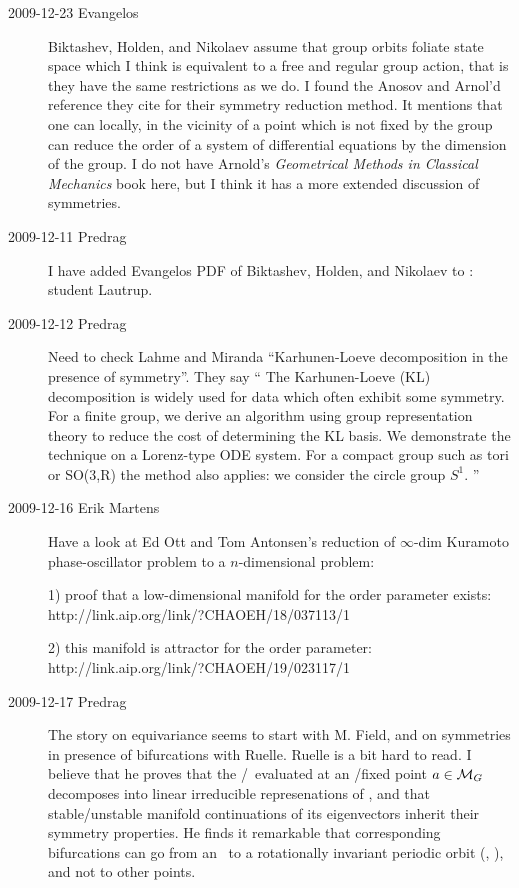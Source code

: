 \begin{description}
\item[2009-12-23 Evangelos]
Biktashev, Holden, and Nikolaev assume that group
orbits foliate state space which I think is equivalent to a
free and regular group action, that is they have the same
restrictions as we do.  I found the Anosov and Arnol'd reference
they cite for their symmetry reduction method. It mentions that
one can locally, in the vicinity of a point which is not fixed by
the group can reduce the order of a system of differential equations
by the dimension of the group. I do not have Arnold's \emph{Geometrical Methods
in Classical Mechanics} book here, but I think it has a more extended
discussion of symmetries.

\item[2009-12-11 Predrag] I have added Evangelos PDF of Biktashev,
Holden, and Nikolaev to : student Lautrup.

\item[2009-12-12 Predrag] Need to check Lahme and Miranda
``Karhunen-Loeve decomposition in the presence of symmetry''. They say
``
The Karhunen-Loeve (KL) decomposition is
  widely used for data which often exhibit some symmetry.
  For a finite group, we derive an
  algorithm using group representation theory to reduce the
  cost of determining the KL basis. We demonstrate the
  technique on a Lorenz-type ODE system. For a compact group
  such as tori or SO(3,R) the method also applies: we
  consider the circle group $S^1$.
''
                                    \toCB


\item[2009-12-16 Erik Martens] %
Have a look at
Ed Ott and Tom Antonsen's reduction of $\infty$-dim Kuramoto phase-oscillator
problem to a $n$-dimensional problem:

1) proof that a low-dimensional manifold for the order parameter exists:
\\
{http://link.aip.org/link/?CHAOEH/18/037113/1}

2) this manifold is attractor for the order parameter:
\\
{http://link.aip.org/link/?CHAOEH/19/023117/1}

\item[2009-12-17 Predrag]
The story on equivariance seems to start with M. Field, and
on symmetries in presence of bifurcations with Ruelle. Ruelle
is a bit hard to read. I believe that he proves that the
\stabmat/\jacobianM\ evaluated at an \eqv/fixed point $a \in {\cal M}_G$
decomposes into linear irreducible represenations of \Group, and that
stable/unstable manifold continuations of its eigenvectors inherit their
symmetry properties. He finds it remarkable that corresponding
bifurcations can go from an \eqv\ to a rotationally invariant periodic
orbit (\ie, \reqv), and not to other points.
	                                                           \toCB


\end{description}
